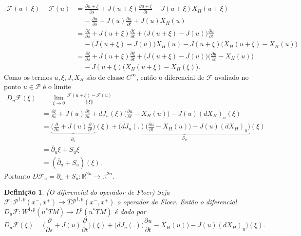 \documentclass[12pt]{book}
\newtheorem{definicao}[teorema]{Definição}
\newcommand{\bigparenteses}[1]{\Big( #1 \Big) }
\newcommand{\caminhosexponenciaisconectantesabrev}{\mathcal{P}}
\newcommand{\caminhosexponenciaisconectantes}[2]{\mathcal{P}^{1,p}(#1, #2)}
\newcommand{\caminhosexponenciaisconectantespadrao}{\caminhosexponenciaisconectantes{x^{-}}{x^{+}}}
\newcommand{\campohamiltoniano}[1]{X_{H}(#1)}
\newcommand{\diferencialfloerponto}[1]{D_{#1}\operadorFloer}
\newcommand{\derivadaparcial}[2]{\frac{\partial #1}{\partial #2}}
\newcommand{\diferencialhamiltoniano}[1]{(dX_{H})_{#1}}
\newcommand{\espacoLp}[1]{L^{p}(#1)}
\newcommand{\espacosobolev}[1]{W^{1,p}(#1)}
\newcommand{\operadorFloer}{\mathcal{F}}
\newcommand{\operadorFloerDefinicao}[1]{\derivadaparcial{#1}{s} + J(#1)\derivadaparcial{#1}{t} - J(#1)X_{H}(#1)}
\newcommand{\operadorFloerParametro}[1]{\mathcal{F}(#1)}
\newcommand{\norma}[1]{||#1||}
\newcommand{\operadorcauchyabrev}[1]{\overline{\partial}_{#1}}
\newcommand{\pullbackfibradotangente}[2]{#1^{*}T#2}
\newcommand{\pullbackfibradotangenteM}[1]{\pullbackfibradotangente{#1}{M}}
\newcommand{\real}[1]{\mathbb{R}^{#1}}
\begin{document}
	$$
	\begin{aligned}
	\operadorFloerParametro{u+\xi}-\operadorFloerParametro{u}
	&= \operadorFloerDefinicao{u+\xi}
	\\
	&\;\;\;\; -\derivadaparcial{u}{s} - J(u)\derivadaparcial{u}{t} + J(u)\campohamiltoniano{u}
	\\
	&=\derivadaparcial{\xi}{s}+J(u+\xi)\derivadaparcial{\xi}{t}+\bigparenteses{J(u+\xi)-J(u)}\derivadaparcial{u}{t}
	\\
	&\;\;\;\;-\bigparenteses{J(u+\xi)-J(u)}\campohamiltoniano{u} 
	-J(u+\xi)\bigparenteses{\campohamiltoniano{u+\xi}-\campohamiltoniano{u}}
	\\
	&=\derivadaparcial{\xi}{s} + J(u+\xi)\derivadaparcial{\xi}{t} + \bigparenteses{J(u+\xi)-J(u)}\bigparenteses{\derivadaparcial{u}{t} - X_{H}(u)}  
	\\
	&\;\;\;\; -J(u+\xi)\bigparenteses{X_{H}(u+\xi) - X_{H}(\xi)}.
	\end{aligned}
	$$
	Como os termos $u, \xi, J, X_{H}$ são de classe $C^{\infty}$, então o diferencial de $\operadorFloer$ avaliado no ponto $u\in \caminhosexponenciaisconectantesabrev$ é o limite 
	$$
	\begin{aligned}
	\diferencialfloerponto{u}(\xi)
	&=\lim_{\xi \to 0} \frac{	\operadorFloerParametro{u+\xi}-\operadorFloerParametro{u}}{\norma{\xi}}
	\\
	&= \derivadaparcial{\xi}{s} + J(u)\derivadaparcial{\xi}{t}+ dJ_{u}(\xi)\bigparenteses{\derivadaparcial{u}{t} - X_{H}(u)} - J(u) \diferencialhamiltoniano{u}(\xi)
	\\
	&= \underbrace{\Big( \derivadaparcial{}{s} + J(u)\derivadaparcial {}{t}\Big)}_{\overline{\partial}_{u}}(\xi)+ \underbrace{\Big(dJ_{u}(.)\bigparenteses{\derivadaparcial{u}{t} - X_{H}(u)} - J(u) \diferencialhamiltoniano{u}\Big)}_{S_{u}}(\xi)
	\\
	&= \operadorcauchyabrev{u} \xi + S_{u}\xi
	\\
	&= (\operadorcauchyabrev{u}  + S_{u})(\xi).
	\end{aligned}
	$$
	Portanto $ D\operadorFloer_{u}= \operadorcauchyabrev{u}  + S_{u}: \real{2n} \to \real{2n}$.

	\begin{definicao}
		(O diferencial do operador de Floer) Seja $\operadorFloer: \caminhosexponenciaisconectantespadrao \to T\caminhosexponenciaisconectantespadrao $ o operador de Floer. Então o diferencial $\diferencialfloerponto{u}: \espacosobolev{\pullbackfibradotangenteM{u}}\to \espacoLp{\pullbackfibradotangenteM{u}}$ é dado por
		$$
		\diferencialfloerponto{u}(\xi)= \Big( \derivadaparcial{}{s} + J(u)\derivadaparcial {}{t}\Big)(\xi)+ \Big(dJ_{u}(.)\bigparenteses{\derivadaparcial{u}{t} - X_{H}(u)} - J(u) \diferencialhamiltoniano{u}\Big)(\xi).
		$$
	\end{definicao}
	
\end{document}
